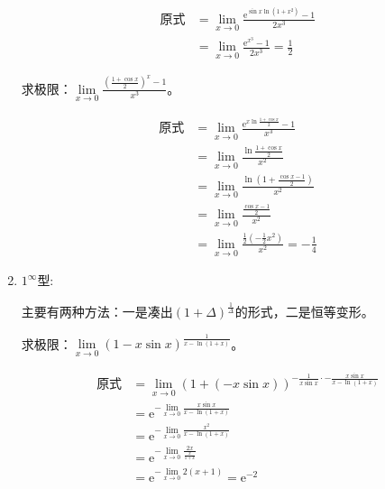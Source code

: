 \begin{enumerate}
            \begin{solution}
                \begin{align*}
                \text{原式}
                &=\lim_{x \to 0}\frac{\mathrm{e}^{\sin x \ln (1+x^2)}-1}{2x^3}\\
                 &=\lim_{x \to 0}\frac{\mathrm{e}^{x^3}-1}{2x^3}=\frac{1}{2}
             \end{align*}
            \end{solution}

            \begin{example}
                求极限：$\lim\limits_{x \to 0} \displaystyle\frac{(\frac{1+\cos x}{2})^x-1}{x^3}$。
            \end{example}

            \begin{solution}
            \begin{align*}
                \text{原式}
                &=\lim_{x \to 0}\frac{\mathrm{e}^{x \ln{\frac{1+\cos x}{2}}}-1}{x^3}\\
                 &=\lim_{x \to 0}\frac{\ln{\frac{1+\cos x}{2}}}{x^2}\\
                 &=\lim_{x \to 0} \frac{\ln{(1+\frac{\cos x-1}{2})}}{x^2}\\
                 &=\lim_{x \to 0}\frac{\frac{\cos x-1}{2}}{x^2}\\
                 &=\lim_{x \to 0}\frac{\frac{1}{2} (-\frac{1}{2}x^2)}{x^2}=-\frac{1}{4}
            \end{align*}
            \end{solution}

            \item $ 1^{\infty} $型:
            

            主要有两种方法：一是凑出$(1+\Delta)^{\frac{1}{\Delta}}$的形式，二是恒等变形。

            \begin{example}
                求极限：$\lim\limits_{ x \to 0}(1-x\sin x)^{\frac{1}{x - \ln (1+x)}}$。
            \end{example}
            
            \begin{solution}
                \begin{align*}
                    \text{原式}
                    &=\lim_{ x\to 0}(1+(-x \sin x))^{-\frac{1}{x \sin x} \cdot -\frac{x \sin x}{x-\ln (1+x)}}\\
                    &= \mathrm{e}^{-\lim\limits_{x \to 0}\frac{x \sin x}{x-\ln(1+x)}}\\
                    &= \mathrm{e}^{-\lim\limits_{x \to 0}\frac{x^2}{x -\ln(1+x)}}\\
                    &= \mathrm{e}^{-\lim\limits_{x \to 0}\frac{2x}{\frac{x}{1+x}}}\\
                    &= \mathrm{e}^{-\lim\limits_{x \to 0}2(x+1)}=\mathrm{e}^{-2}
                \end{align*}
            \end{solution}

        \end{enumerate}



   